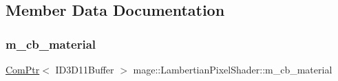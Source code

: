 \subsection{Member Data Documentation}
\hypertarget{classmage_1_1_lambertian_pixel_shader_aff89982b5f85531515ec2316930b2944}{}\label{classmage_1_1_lambertian_pixel_shader_aff89982b5f85531515ec2316930b2944} 
\subsubsection{\texorpdfstring{m\+\_\+cb\+\_\+material}{m\_cb\_material}}
{\footnotesize\ttfamily \hyperlink{namespacemage_ae74f374780900893caa5555d1031fd79}{Com\+Ptr}$<$ I\+D3\+D11\+Buffer $>$ mage\+::\+Lambertian\+Pixel\+Shader\+::m\+\_\+cb\+\_\+material\hspace{0.3cm}{\ttfamily [private]}}

